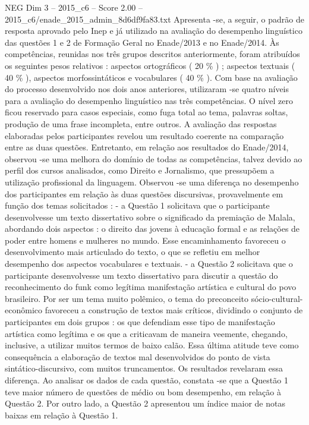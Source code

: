 \begin{textsample}{NEG Dim 3 – 2015\_c6 – Score 2.00 – 2015\_c6/enade\_2015\_admin\_8d6df9fa83.txt}
Apresenta -se, a seguir, o padrão de resposta aprovado pelo Inep e já utilizado na avaliação do desempenho linguístico das questões 1 e 2 de Formação Geral no Enade/2013 e no Enade/2014.
Às competências, reunidas nos três grupos descritos anteriormente, foram atribuídos os seguintes pesos relativos : aspectos ortográficos ( 20 \% ) ; aspectos textuais ( 40 \% ), aspectos morfossintáticos e vocabulares ( 40 \% ).
Com base na avaliação do processo desenvolvido nos dois anos anteriores, utilizaram -se quatro níveis para a avaliação do desempenho linguístico nas três competências.
O nível zero ficou reservado para casos especiais, como fuga total ao tema, palavras soltas, produção de uma frase incompleta, entre outros.
A avaliação das respostas elaboradas pelos participantes revelou um resultado coerente na comparação entre as duas questões.
Entretanto, em relação aos resultados do Enade/2014, observou -se uma melhora do domínio de todas as competências, talvez devido ao perfil dos cursos analisados, como Direito e Jornalismo, que pressupõem a utilização profissional da linguagem.
Observou -se uma diferença no desempenho dos participantes em relação às duas questões discursivas, provavelmente em função dos temas solicitados : - a Questão 1 solicitava que o participante desenvolvesse um texto dissertativo sobre o significado da premiação de Malala, abordando dois aspectos : o direito das jovens à educação formal e as relações de poder entre homens e mulheres no mundo.
Esse encaminhamento favoreceu o desenvolvimento mais articulado do texto, o que se refletiu em melhor desempenho dos aspectos vocabulares e textuais. - a Questão 2 solicitava que o participante desenvolvesse um texto dissertativo para discutir a questão do reconhecimento do funk como legítima manifestação artística e cultural do povo brasileiro.
Por ser um tema muito polêmico, o tema do preconceito sócio-cultural-econômico favoreceu a construção de textos mais críticos, dividindo o conjunto de participantes em dois grupos : os que defendiam esse tipo de manifestação artística como legítima e os que a criticavam de maneira veemente, chegando, inclusive, a utilizar muitos termos de baixo calão.
Essa última atitude teve como consequência a elaboração de textos mal desenvolvidos do ponto de vista sintático-discursivo, com muitos truncamentos.
Os resultados revelaram essa diferença.
Ao analisar os dados de cada questão, constata -se que a Questão 1 teve maior número de questões de médio ou bom desempenho, em relação à Questão 2.
Por outro lado, a Questão 2 apresentou um índice maior de notas baixas em relação à Questão 1.

\end{textsample}
